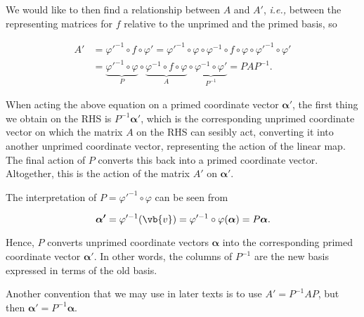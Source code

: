 \documentclass[a4paper,12pt]{report}
\begin{document}
We would like to then find a relationship between \(A\) and \(A'\), \textit{i.e.,} between the representing matrices for \(f\) relative to the unprimed and the primed basis, so

\begin{equation} \label{changeofbasis} 
    \begin{aligned}
        A' &= \varphi'^{-1} \circ f \circ \varphi' = \varphi'^{-1} \circ \varphi \circ \varphi^{-1} \circ f \circ \varphi \circ \varphi'^{-1} \circ \varphi' \\
           &= \underbrace{\varphi'^{-1} \circ \varphi}_{P} \circ \underbrace{\varphi^{-1} \circ f \circ \varphi}_{A} \circ \underbrace{\varphi^{-1} \circ \varphi'}_{P^{-1}} = P A P^{-1}.
    \end{aligned}
\end{equation}

When acting the above equation on a primed coordinate vector \(\boldsymbol{\alpha '} \), the first thing we obtain on the RHS is \(P^{-1} \boldsymbol{\alpha '} \), which is the corresponding unprimed coordinate vector on which the matrix \(A\) on the RHS can sesibly act, converting it into another unprimed coordinate vector, representing the action of the linear map. The final action of \(P\) converts this back into a primed coordinate vector. Altogether, this is the action of the matrix \(A'\) on \(\boldsymbol{\alpha '} \). 

The interpretation of \(P = \varphi '^{-1} \circ \varphi \) can be seen from 

\begin{equation}
    \boldsymbol{\alpha '} = \varphi '^{-1} (\vb{v} ) = \varphi '^{-1} \circ \varphi (\boldsymbol{\alpha } ) = P \boldsymbol{\alpha }.  
\end{equation}

Hence, \(P \) converts unprimed coordinate vectors \(\boldsymbol{\alpha } \) into the corresponding primed coordinate vector \(\boldsymbol{\alpha '} \). In other words, the columns of \(P^{-1} \) are the new basis expressed in terms of the old basis.

Another convention that we may use in later texts is to use \(A' = P^{-1} AP\), but then \(\boldsymbol{\alpha } ' = P^{-1} \boldsymbol{\alpha } \).  
\end{document}
